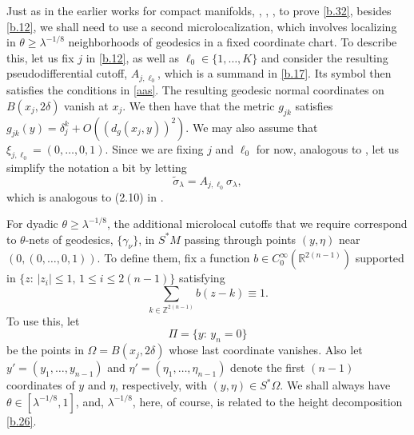 \documentclass[10pt]{amsart}
\newcommand{\la}{\lambda}
\renewcommand{\Pi}{\varPi}
\newcommand{\1}{{\bf 1}}
\begin{document}
Just as in the earlier works for compact manifolds, \cite{BHSsp}, \cite{SBLOg}, \cite{HSp},
to prove \eqref{b.32}, besides \eqref{b.12}, we shall need to use a second microlocalization, which
involves localizing in $\theta\ge\la^{-1/8}$ neighborhoods of geodesics in a fixed coordinate chart.  To describe
this, let us fix $j$ in \eqref{b.12}, as well as $\ell_0\in \{1,\dots,K\}$ and consider the resulting
pseudodifferential cutoff, $A_{j,\ell_0}$, which is a summand in \eqref{b.17}.  Its symbol then satisfies
the conditions in \eqref{aas}.  The resulting geodesic normal coordinates on $B(x_j,2\delta)$
vanish at $x_j$.  We then have that the metric $g_{jk}$ satisfies $g_{jk}(y)=\delta^k_j+O((d_g(x_j,y))^2)$.  We may also
assume that $\xi_{j,\ell_0}=(0,\dots,0,1)$.  Since we are fixing
$j$ and $\ell_0$ for now, analogous to \cite{HSp}, let us simplify the notation a bit by letting
\begin{equation}\label{b.43}
\tilde \sigma_\la =A_{j,\ell_0}\sigma_\la,
\end{equation}
which is analogous to (2.10) in \cite{HSp}.


For dyadic $\theta\ge \la^{-1/8}$, the additional microlocal cutoffs that we require correspond to
$\theta$-nets of geodesics,
$\{\gamma_\nu\}$, 
in $S^*M$ passing through points $(y,\eta)$ near $(0,(0,\dots,0,1))$.   To define them, fix a function
$b\in C^\infty_0({\mathbb R}^{2(n-1)})$ supported in $\{z: \, |z_i|\le 1, \, 1\le i\le 2(n-1)\}$ satisfying
\begin{equation}\label{b.44}
\sum_{k\in {\mathbb Z}^{2(n-1)}} b(z-k)\equiv 1.
\end{equation}
To use this, let
$$\Pi =\{ y: \, y_n=0\}$$
be the points in $\Omega=B(x_j,2\delta)$ whose last coordinate vanishes.  Also let
$y'=(y_1,\dots, y_{n-1})$ and $\eta'=(\eta_1,\dots, \eta_{n-1})$ denote the first
$(n-1)$ coordinates of $y$ and $\eta$, respectively, with $(y,\eta)\in S^*\Omega$. 
 We shall always have $\theta\in [\la^{-1/8},1]$, and,
$\la^{-1/8}$, here, of course, is related to the height decomposition \eqref{b.26}.
\end{document}

